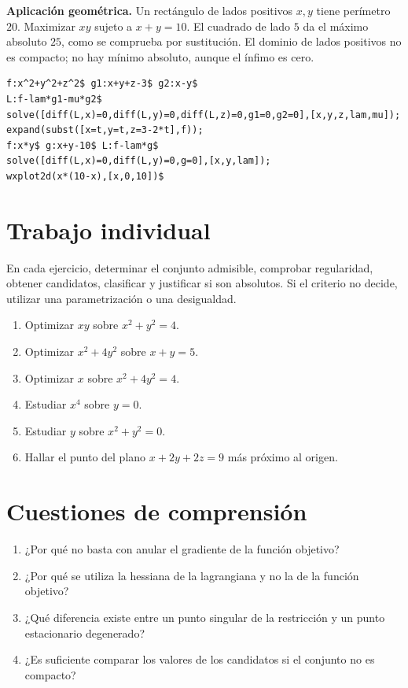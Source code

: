 \documentclass[12pt,a4paper]{article}
\begin{document}
\textbf{Aplicación geométrica.} Un rectángulo de lados positivos $x,y$ tiene perímetro $20$. Maximizar $xy$ sujeto a $x+y=10$. El cuadrado de lado $5$ da el máximo absoluto $25$, como se comprueba por sustitución. El dominio de lados positivos no es compacto; no hay mínimo absoluto, aunque el ínfimo es cero.
\begin{lstlisting}
f:x^2+y^2+z^2$ g1:x+y+z-3$ g2:x-y$
L:f-lam*g1-mu*g2$
solve([diff(L,x)=0,diff(L,y)=0,diff(L,z)=0,g1=0,g2=0],[x,y,z,lam,mu]);
expand(subst([x=t,y=t,z=3-2*t],f));
f:x*y$ g:x+y-10$ L:f-lam*g$
solve([diff(L,x)=0,diff(L,y)=0,g=0],[x,y,lam]);
wxplot2d(x*(10-x),[x,0,10])$
\end{lstlisting}
\section{Trabajo individual}
En cada ejercicio, determinar el conjunto admisible, comprobar regularidad, obtener candidatos, clasificar y justificar si son absolutos. Si el criterio no decide, utilizar una parametrización o una desigualdad.
\begin{enumerate}
\item Optimizar $xy$ sobre $x^2+y^2=4$.
\item Optimizar $x^2+4y^2$ sobre $x+y=5$.
\item Optimizar $x$ sobre $x^2+4y^2=4$.
\item Estudiar $x^4$ sobre $y=0$.
\item Estudiar $y$ sobre $x^2+y^2=0$.
\item Hallar el punto del plano $x+2y+2z=9$ más próximo al origen.
\end{enumerate}
\section{Cuestiones de comprensión}
\begin{enumerate}
\item ¿Por qué no basta con anular el gradiente de la función objetivo?
\item ¿Por qué se utiliza la hessiana de la lagrangiana y no la de la función objetivo?
\item ¿Qué diferencia existe entre un punto singular de la restricción y un punto estacionario degenerado?
\item ¿Es suficiente comparar los valores de los candidatos si el conjunto no es compacto?
\end{enumerate}
\end{document}
